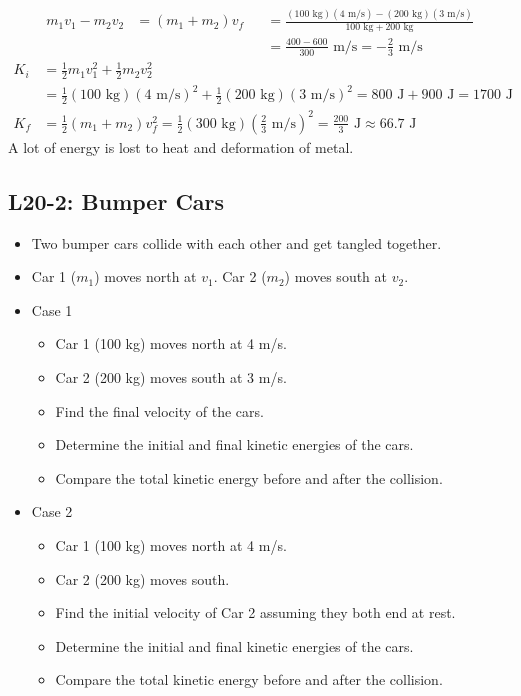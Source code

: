 \documentclass[]{article}
\newcommand{\Week}{20}
\begin{document}
\begin{TeacherMargin}
\begin{align*}
	m_{1}v_{1} - m_{2}v_{2} & = (m_{1}+m_{2})v_{f} &  & = \frac{(100\text{ kg})(4\text{ m/s})-(200\text{ kg})(3\text{ m/s})}{100\text{ kg}+200\text{ kg}} \\
	& & & = \frac{400-600}{300}\text{ m/s} = -\frac{2}{3}\text{ m/s}
\end{align*}
\begin{align*}
	K_{i} & = \frac{1}{2}m_{1}v_{1}^{2} + \frac{1}{2}m_{2}v_{2}^{2} \\
	& = \frac{1}{2}(100\text{ kg})(4\text{ m/s})^{2} + \frac{1}{2}(200\text{ kg})(3\text{ m/s})^{2} = 800\text{ J} + 900\text{ J} = 1700\text{ J} \\
	K_{f} & = \frac{1}{2}(m_{1}+m_{2})v_{f}^{2} = \frac{1}{2}(300\text{ kg})\left(\frac{2}{3}\text{ m/s}\right)^{2} = \frac{200}{3}\text{ J} \approx 66.7\text{ J}
\end{align*}
A lot of energy is lost to heat and deformation of metal.
\end{TeacherMargin}
\begin{PresentSpace}
\vspace{-10pt}
\section*{L\Week-2: Bumper Cars}
\vspace{-10pt}
\begin{itemize}
	\item Two bumper cars collide with each other and get tangled together.
	\item Car 1 ($m_{1}$) moves north at $v_{1}$. Car 2 ($m_{2}$) moves south at $v_{2}$.
\end{itemize}
\begin{multicols}{2}
	\begin{itemize}
		\item Case 1
		\begin{itemize}
			\large
			\item Car 1 (100 kg) moves north at 4 m/s.
			\item Car 2 (200 kg) moves south at 3 m/s.
			\item Find the final velocity of the cars.
			\item Determine the initial and final kinetic energies of the cars.
			\item Compare the total kinetic energy before and after the collision.
		\end{itemize}
		\item Case 2
		\begin{itemize}
			\large
			\item Car 1 (100 kg) moves north at 4 m/s.
			\item Car 2 (200 kg) moves south.
			\item Find the initial velocity of Car 2 assuming they both end at rest.
			\item Determine the initial and final kinetic energies of the cars.
			\item Compare the total kinetic energy before and after the collision.
		\end{itemize}
	\end{itemize}
\end{multicols}
\end{PresentSpace}
\end{document}

